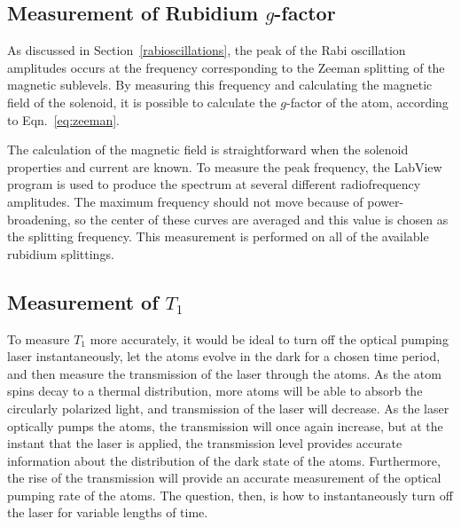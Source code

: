 \subsection{Measurement of Rubidium $g$-factor}

As discussed in Section~\ref{rabioscillations}, the peak of the Rabi oscillation amplitudes occurs at the frequency corresponding to the Zeeman splitting of the magnetic sublevels. By measuring this frequency and calculating the magnetic field of the solenoid, it is possible to calculate the $g$-factor of the atom, according to Eqn.~\ref{eq:zeeman}.

The calculation of the magnetic field is straightforward when the solenoid properties and current are known. To measure the peak frequency, the LabView program is used to produce the spectrum at several different radiofrequency amplitudes. The maximum frequency should not move because of power-broadening, so the center of these curves are averaged and this value is chosen as the splitting frequency. This measurement is performed on all of the available rubidium splittings.

\subsection{Measurement of $T_{1}$}\label{measurementoft1}

To measure $T_{1}$ more accurately, it would be ideal to turn off the optical pumping laser instantaneously, let the atoms evolve in the dark for a chosen time period, and then measure the transmission of the laser through the atoms. \cite{franzen} As the atom spins decay to a thermal distribution, more atoms will be able to absorb the circularly polarized light, and transmission of the laser will decrease. As the laser optically pumps the atoms, the transmission will once again increase, but at the instant that the laser is applied, the transmission level provides accurate information about the distribution of the dark state of the atoms. Furthermore, the rise of the transmission will provide an accurate measurement of the optical pumping rate of the atoms. The question, then, is how to instantaneously turn off the laser for variable lengths of time.

